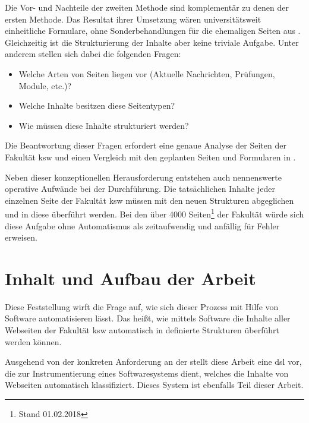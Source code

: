             Die Vor- und Nachteile der zweiten Methode sind komplementär zu denen der ersten Methode.
            Das Resultat ihrer Umsetzung wären universitätsweit einheitliche Formulare,
            ohne Sonderbehandlungen für die ehemaligen Seiten aus \wordpress.
            Gleichzeitig ist die Strukturierung der Inhalte aber keine triviale Aufgabe.
            Unter anderem stellen sich dabei die folgenden Fragen:

            \begin{itemize}
                \item Welche Arten von Seiten liegen vor (Aktuelle Nachrichten, Prüfungen, Module, etc.)?
                \item Welche Inhalte besitzen diese Seitentypen?
                \item Wie müssen diese Inhalte strukturiert werden?
            \end{itemize}

            Die Beantwortung dieser Fragen erfordert eine genaue Analyse der Seiten der Fakultät \gls{ksw}
            und einen Vergleich mit den geplanten Seiten und Formularen in \imperia.
            
            Neben dieser konzeptionellen Herausforderung entstehen auch nennenswerte operative Aufwände bei der Durchführung.
            Die tatsächlichen Inhalte jeder einzelnen Seite der Fakultät \gls{ksw}  müssen
            mit den neuen Strukturen abgeglichen und in diese überführt werden.
            Bei den über 4000 Seiten\footnote{Stand 01.02.2018} der Fakultät
            würde sich diese Aufgabe ohne Automatismus als zeitaufwendig und anfällig für Fehler erweisen.

    \section{Inhalt und Aufbau der Arbeit}
        Diese Feststellung wirft die Frage auf, wie sich dieser Prozess mit Hilfe von Software automatisieren lässt.
        Das heißt, wie mittels Software die Inhalte aller Webseiten der Fakultät \gls{ksw}
        automatisch in definierte Strukturen überführt werden können.
        
        Ausgehend von der konkreten Anforderung an der \fernUni stellt diese Arbeit eine
        \gls{dsl} vor, die zur Instrumentierung eines Softwaresystems dient,
        welches die Inhalte von Webseiten automatisch klassifiziert.
        Dieses System ist ebenfalls Teil dieser Arbeit.

